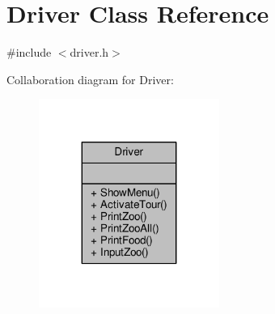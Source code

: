 \hypertarget{classDriver}{}\section{Driver Class Reference}
\label{classDriver}


{\ttfamily \#include $<$driver.\+h$>$}



Collaboration diagram for Driver\+:
\nopagebreak
\begin{figure}[H]
\begin{center}
\leavevmode
\includegraphics[width=167pt]{classDriver__coll__graph}
\end{center}
\end{figure}
